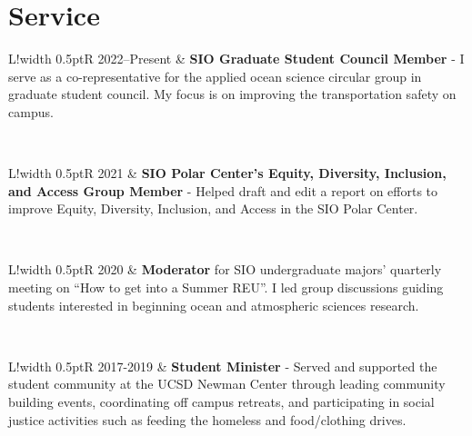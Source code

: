 \documentclass[10pt]{article}
\newcommand\VRule{\color{lightgray}\vrule width 0.5pt}
\begin{document}
\section*{Service}
\vspace{.3cm}
\begin{tabular}{L!{\VRule}R}
2022--Present & \textbf{SIO Graduate Student Council Member} - I serve as a co-representative for the applied ocean science circular group in graduate student council. My focus is on improving the transportation safety on campus.\\[5pt]
\end{tabular} 
\\[10pt]
\begin{tabular}{L!{\VRule}R}
2021 & \textbf{SIO Polar Center's Equity, Diversity, Inclusion, and Access Group Member} - Helped draft and edit a report on efforts to improve Equity, Diversity, Inclusion, and Access in the SIO Polar Center. \\[5pt]
\end{tabular} 
\\[10pt]
\begin{tabular}{L!{\VRule}R}
2020 & \textbf{Moderator} for SIO undergraduate majors’ quarterly meeting on ``How to get into a Summer REU''. I led group discussions guiding students interested in beginning ocean and atmospheric sciences research. 
\end{tabular}
\\[10pt]
\begin{tabular}{L!{\VRule}R}
2017-2019 & \textbf{Student Minister} - Served and supported the student community at the UCSD Newman Center through leading community building events, coordinating off campus retreats, and participating in social justice activities such as feeding the homeless and food/clothing drives.  \\[5pt]
\end{tabular} 

\vspace{.3cm}
\end{document}
